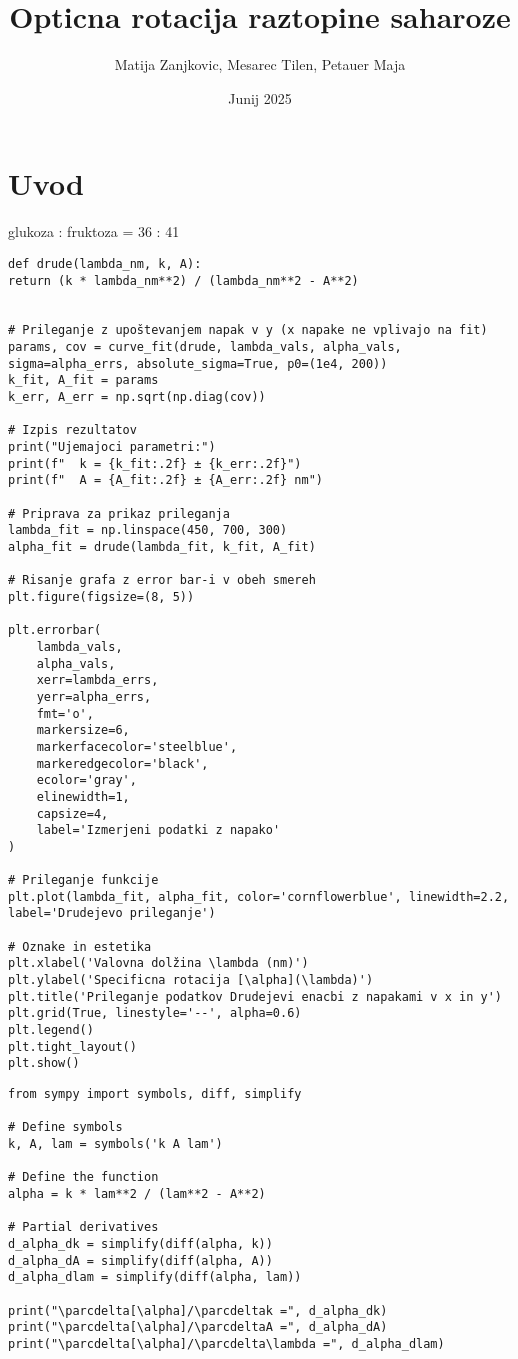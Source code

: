 \documentclass[14pt]{extarticle}
\title{Opticna rotacija raztopine saharoze}
\author{Matija Zanjkovic, Mesarec Tilen, Petauer Maja}
\date{Junij 2025}
\begin{document}
\maketitle

\section*{Uvod}

glukoza : fruktoza = 36 : 41

\pagebreak

\begin{lstlisting}
def drude(lambda_nm, k, A):
return (k * lambda_nm**2) / (lambda_nm**2 - A**2)


# Prileganje z upoštevanjem napak v y (x napake ne vplivajo na fit)
params, cov = curve_fit(drude, lambda_vals, alpha_vals, sigma=alpha_errs, absolute_sigma=True, p0=(1e4, 200))
k_fit, A_fit = params
k_err, A_err = np.sqrt(np.diag(cov))

# Izpis rezultatov
print("Ujemajoci parametri:")
print(f"  k = {k_fit:.2f} ± {k_err:.2f}")
print(f"  A = {A_fit:.2f} ± {A_err:.2f} nm")

# Priprava za prikaz prileganja
lambda_fit = np.linspace(450, 700, 300)
alpha_fit = drude(lambda_fit, k_fit, A_fit)

# Risanje grafa z error bar-i v obeh smereh
plt.figure(figsize=(8, 5))

plt.errorbar(
    lambda_vals,
    alpha_vals,
    xerr=lambda_errs,
    yerr=alpha_errs,
    fmt='o',
    markersize=6,
    markerfacecolor='steelblue',
    markeredgecolor='black',
    ecolor='gray',
    elinewidth=1,
    capsize=4,
    label='Izmerjeni podatki z napako'
)

# Prileganje funkcije
plt.plot(lambda_fit, alpha_fit, color='cornflowerblue', linewidth=2.2, label='Drudejevo prileganje')

# Oznake in estetika
plt.xlabel('Valovna dolžina \lambda (nm)')
plt.ylabel('Specificna rotacija [\alpha](\lambda)')
plt.title('Prileganje podatkov Drudejevi enacbi z napakami v x in y')
plt.grid(True, linestyle='--', alpha=0.6)
plt.legend()
plt.tight_layout()
plt.show()
\end{lstlisting}


\pagebreak

\begin{lstlisting}
from sympy import symbols, diff, simplify

# Define symbols
k, A, lam = symbols('k A lam')

# Define the function
alpha = k * lam**2 / (lam**2 - A**2)

# Partial derivatives
d_alpha_dk = simplify(diff(alpha, k))
d_alpha_dA = simplify(diff(alpha, A))
d_alpha_dlam = simplify(diff(alpha, lam))

print("\parcdelta[\alpha]/\parcdeltak =", d_alpha_dk)
print("\parcdelta[\alpha]/\parcdeltaA =", d_alpha_dA)
print("\parcdelta[\alpha]/\parcdelta\lambda =", d_alpha_dlam)
\end{lstlisting}
\end{document}
